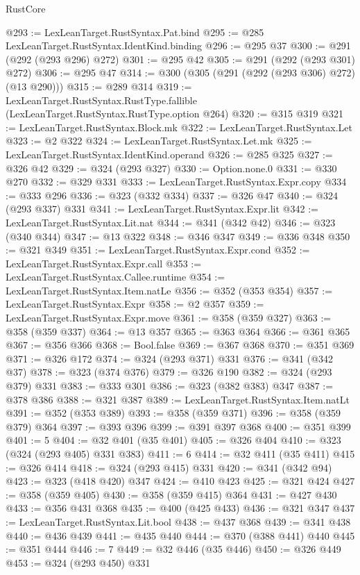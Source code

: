 \begin{lexlean}{RustCore}
\begin{coremodule}
@293 := LexLeanTarget.RustSyntax.Pat.bind
@295 := @285 LexLeanTarget.RustSyntax.IdentKind.binding
@296 := @295 @37
@300 := @291 (@292 (@293 @296) @272)
@301 := @295 @42
@305 := @291 (@292 (@293 @301) @272)
@306 := @295 @47
@314 := @300 (@305 (@291 (@292 (@293 @306) @272) (@13 @290)))
@315 := @289 @314
@319 := LexLeanTarget.RustSyntax.RustType.fallible (LexLeanTarget.RustSyntax.RustType.option @264)
@320 := @315 @319
@321 := LexLeanTarget.RustSyntax.Block.mk
@322 := LexLeanTarget.RustSyntax.Let
@323 := @2 @322
@324 := LexLeanTarget.RustSyntax.Let.mk
@325 := LexLeanTarget.RustSyntax.IdentKind.operand
@326 := @285 @325
@327 := @326 @42
@329 := @324 (@293 @327)
@330 := Option.none.{0}
@331 := @330 @270
@332 := @329 @331
@333 := LexLeanTarget.RustSyntax.Expr.copy
@334 := @333 @296
@336 := @323 (@332 @334)
@337 := @326 @47
@340 := @324 (@293 @337) @331
@341 := LexLeanTarget.RustSyntax.Expr.lit
@342 := LexLeanTarget.RustSyntax.Lit.nat
@344 := @341 (@342 @42)
@346 := @323 (@340 @344)
@347 := @13 @322
@348 := @346 @347
@349 := @336 @348
@350 := @321 @349
@351 := LexLeanTarget.RustSyntax.Expr.cond
@352 := LexLeanTarget.RustSyntax.Expr.call
@353 := LexLeanTarget.RustSyntax.Callee.runtime
@354 := LexLeanTarget.RustSyntax.Item.natLe
@356 := @352 (@353 @354)
@357 := LexLeanTarget.RustSyntax.Expr
@358 := @2 @357
@359 := LexLeanTarget.RustSyntax.Expr.move
@361 := @358 (@359 @327)
@363 := @358 (@359 @337)
@364 := @13 @357
@365 := @363 @364
@366 := @361 @365
@367 := @356 @366
@368 := Bool.false
@369 := @367 @368
@370 := @351 @369
@371 := @326 @172
@374 := @324 (@293 @371) @331
@376 := @341 (@342 @37)
@378 := @323 (@374 @376)
@379 := @326 @190
@382 := @324 (@293 @379) @331
@383 := @333 @301
@386 := @323 (@382 @383) @347
@387 := @378 @386
@388 := @321 @387
@389 := LexLeanTarget.RustSyntax.Item.natLt
@391 := @352 (@353 @389)
@393 := @358 (@359 @371)
@396 := @358 (@359 @379) @364
@397 := @393 @396
@399 := @391 @397 @368
@400 := @351 @399
@401 := 5
@404 := @32 @401 (@35 @401)
@405 := @326 @404
@410 := @323 (@324 (@293 @405) @331 @383)
@411 := 6
@414 := @32 @411 (@35 @411)
@415 := @326 @414
@418 := @324 (@293 @415) @331
@420 := @341 (@342 @94)
@423 := @323 (@418 @420) @347
@424 := @410 @423
@425 := @321 @424
@427 := @358 (@359 @405)
@430 := @358 (@359 @415) @364
@431 := @427 @430
@433 := @356 @431 @368
@435 := @400 (@425 @433)
@436 := @321 @347
@437 := LexLeanTarget.RustSyntax.Lit.bool
@438 := @437 @368
@439 := @341 @438
@440 := @436 @439
@441 := @435 @440
@444 := @370 (@388 @441) @440
@445 := @351 @444
@446 := 7
@449 := @32 @446 (@35 @446)
@450 := @326 @449
@453 := @324 (@293 @450) @331

\end{coremodule}
\end{lexlean}
